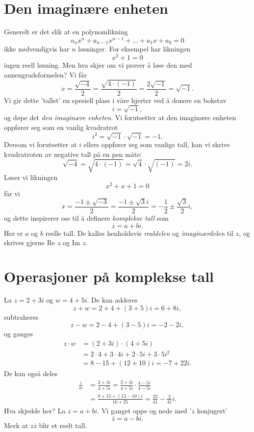

\label{ch:komplekse-tall}
\section*{Den imaginære enheten}
Generelt er det slik at en polynomlikning
\[
a_nx^n+a_{n-1}x^{n-1}+...+a_1x+a_0=0
\]
ikke nødvendigvis har $n$ løsninger. For eksempel har likningen 
\[
x^2+1=0
\]
ingen reell løsning. Men hva skjer om vi prøver å løse den med annengradsformelen? Vi får
\[
x=\frac{\sqrt{-4}}{2}=\frac{\sqrt{4\cdot (-1)}}{2}=\frac{2\sqrt{-1}}{2}=\sqrt{-1}.
\]
Vi gir dette 'tallet' en spesiell plass i våre hjerter ved å donere en bokstav
\[
i=\sqrt{-1},
\]
og døpe det \emph{den imaginære enheten}. Vi forutsetter at den imaginære enheten oppfører seg som en vanlig kvadratrot
\[
i^2=\sqrt{-1}\cdot\sqrt{-1}=-1.
\]
Dersom vi forutsetter at $i$ ellers oppfører seg som vanlige tall, kan vi skrive kvadratroten av negative tall på en pen måte:
\begin{equation*}
\sqrt{-4}=\sqrt{4\cdot (-1)}=\sqrt{4}\cdot \sqrt{(-1)}=2i.
\end{equation*}
Løser vi likningen
\[
x^2+x+1=0
\]
får vi 
\[
x=\frac{-1\pm \sqrt{-3}}{2}=\frac{-1\pm \sqrt{3}i}{2}=-\frac{1}{2}\pm\frac{\sqrt{3}}{2}i,
\]
og dette inspirerer oss til å definere \emph{komplekse tall} som 
\[
z=a+bi.
\]
Her er $a$ og $b$ reelle tall. De kalles henholdsvis \emph{realdelen} og \emph{imaginærdelen} til $z$, og skrives gjerne Re $z$ og Im $z$. 


\section*{Operasjoner på komplekse tall}
La $z=2+3i$ og $w=4+5i$. De kan adderes
\[
z+w=2+4+(3+5)i=6+8i,
\]
subtraheres
\[
z-w=2-4+(3-5)i=-2-2i,
\]
og ganges 
\begin{align*}
z\cdot w&=(2+3i)\cdot(4+5i)\\&=2\cdot 4+3\cdot 4i+2\cdot 5i+3\cdot 5 i^2\\&=8-15+(12+10)i=-7+22i.
\end{align*}
De kan også deles
\begin{align*}
\frac{z}{w}&=\frac{2+3i}{4+5i}=\frac{2+3i}{4+5i}\cdot\frac{4-5i}{4-5i}\\&=\frac{8+15+(12-10)i}{16+25}=\frac{22}{41}-\frac{2}{41}i.
\end{align*}
Hva skjedde her? La $z=a+bi$. Vi ganget oppe og nede med '$z$ konjugert'
\[
\overline z =a-bi.
\]
Merk at $z\overline z$ blir et reelt tall. 



